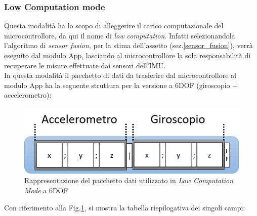 \subsubsection{Low Computation mode}
\label{lcm}
Questa modalità ha lo scopo di alleggerire il carico computazionale del microcontrollore, da qui il nome di \textit{low computation}. Infatti selezionandola l'algoritmo di \textit{sensor fusion}, per la stima dell'assetto (sez.\ref{sensor_fusion}), verrà eseguito dal modulo App, lasciando al microcontrollore la sola responsabilità di recuperare le misure effettuate dai sensori dell'IMU.\\
In questa modalità il pacchetto di dati da trasferire dal microcontrollore al modulo App ha la seguente struttura per la versione a 6DOF (giroscopio + accelerometro):
\begin{figure}[H]  
	\centering 
	\includegraphics[scale=0.5]{implementazione/lcm6Foto.png}
	\caption{Rappresentazione del pacchetto dati utilizzato in \textit{Low Computation Mode} a 6DOF}
	\label{fig:lcm6Foto}
\end{figure}
Con riferimento alla Fig.\ref{fig:lcm6Foto}, si mostra la tabella riepilogativa dei singoli campi:
